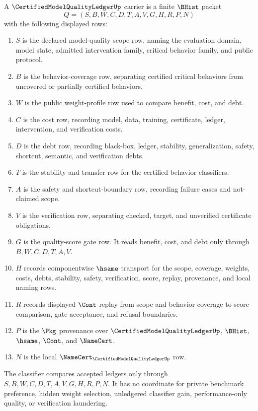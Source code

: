 \begin{definition}
\label{def:certified-model-quality-ledger-carrier}
A $\CertifiedModelQualityLedgerUp$ carrier is a finite $\BHist$ packet
$$
Q=(S,B,W,C,D,T,A,V,G,H,R,P,N)
$$
with the following displayed rows:
\begin{enumerate}
\item $S$ is the declared model-quality scope row, naming the evaluation domain, model state, admitted intervention family, critical behavior family, and public protocol.
\item $B$ is the behavior-coverage row, separating certified critical behaviors from uncovered or partially certified behaviors.
\item $W$ is the public weight-profile row used to compare benefit, cost, and debt.
\item $C$ is the cost row, recording model, data, training, certificate, ledger, intervention, and verification costs.
\item $D$ is the debt row, recording black-box, ledger, stability, generalization, safety, shortcut, semantic, and verification debts.
\item $T$ is the stability and transfer row for the certified behavior classifiers.
\item $A$ is the safety and shortcut-boundary row, recording failure cases and not-claimed scope.
\item $V$ is the verification row, separating checked, target, and unverified certificate obligations.
\item $G$ is the quality-score gate row. It reads benefit, cost, and debt only through $B,W,C,D,T,A,V$.
\item $H$ records componentwise $\hsame$ transport for the scope, coverage, weights, costs, debts, stability, safety, verification, score, replay, provenance, and local naming rows.
\item $R$ records displayed $\Cont$ replay from scope and behavior coverage to score comparison, gate acceptance, and refusal boundaries.
\item $P$ is the $\Pkg$ provenance over $\CertifiedModelQualityLedgerUp$, $\BHist$, $\hsame$, $\Cont$, and $\NameCert$.
\item $N$ is the local $\NameCert_{\CertifiedModelQualityLedgerUp}$ row.
\end{enumerate}
The classifier compares accepted ledgers only through $S,B,W,C,D,T,A,V,G,H,R,P,N$. It has no coordinate for private benchmark preference, hidden weight selection, unledgered classifier gain, performance-only quality, or verification laundering.
\end{definition}

